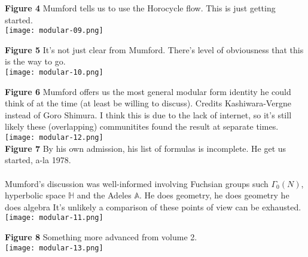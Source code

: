 \documentclass[12pt]{article}
\begin{document}
\noindent \textbf{Figure 4}  Mumford tells us to use the Horocycle flow. This is just getting started. \\
\texttt{[image: modular-09.png]} \\

\newpage

\noindent \textbf{Figure 5} It's not just clear from Mumford.  There's level of obviousness that this is the way to go. \\
\texttt{[image: modular-10.png]} \\

\newpage

\noindent \textbf{Figure 6} Mumford offers us the most general modular form identity he could think of at the time (at least be willing to discuss).  Credits Kashiwara-Vergne instead of Goro Shimura.  I think this is due to the lack of internet, so it's still likely these (overlapping) communitites found the result at separate times.\\
\texttt{[image: modular-12.png]} \\
\noindent \textbf{Figure 7} By his own admission, his list of formulas is incomplete.  He get us started, a-la 1978.  \\ \\ 
Mumford's discussion was well-informed involving Fuchsian groups such $\Gamma_0(N)$, hyperbolic space $\mathbb{H}$ and the Adeles $\mathbb{A}$.  He does geometry, he does geometry he does algebra It's unlikely a comparison of these points of view can be exhausted.\\
\texttt{[image: modular-11.png]} 

\newpage

\noindent \textbf{Figure 8} Something more advanced from volume 2.\\
\texttt{[image: modular-13.png]} \\
\end{document}
